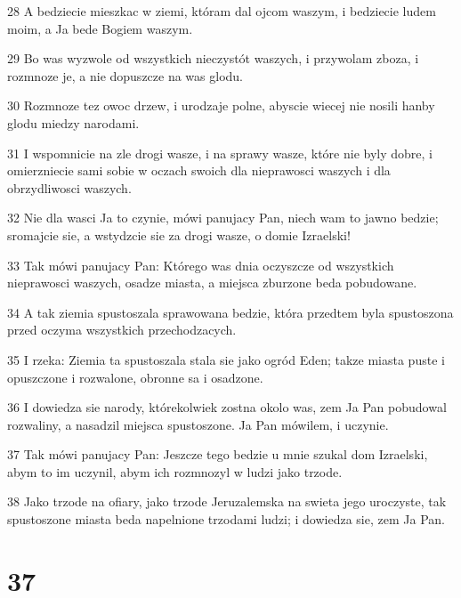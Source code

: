 \par 28 A bedziecie mieszkac w ziemi, któram dal ojcom waszym, i bedziecie ludem moim, a Ja bede Bogiem waszym.
\par 29 Bo was wyzwole od wszystkich nieczystót waszych, i przywolam zboza, i rozmnoze je, a nie dopuszcze na was glodu.
\par 30 Rozmnoze tez owoc drzew, i urodzaje polne, abyscie wiecej nie nosili hanby glodu miedzy narodami.
\par 31 I wspomnicie na zle drogi wasze, i na sprawy wasze, które nie byly dobre, i omierzniecie sami sobie w oczach swoich dla nieprawosci waszych i dla obrzydliwosci waszych.
\par 32 Nie dla wasci Ja to czynie, mówi panujacy Pan, niech wam to jawno bedzie; sromajcie sie, a wstydzcie sie za drogi wasze, o domie Izraelski!
\par 33 Tak mówi panujacy Pan: Którego was dnia oczyszcze od wszystkich nieprawosci waszych, osadze miasta, a miejsca zburzone beda pobudowane.
\par 34 A tak ziemia spustoszala sprawowana bedzie, która przedtem byla spustoszona przed oczyma wszystkich przechodzacych.
\par 35 I rzeka: Ziemia ta spustoszala stala sie jako ogród Eden; takze miasta puste i opuszczone i rozwalone, obronne sa i osadzone.
\par 36 I dowiedza sie narody, którekolwiek zostna okolo was, zem Ja Pan pobudowal rozwaliny, a nasadzil miejsca spustoszone. Ja Pan mówilem, i uczynie.
\par 37 Tak mówi panujacy Pan: Jeszcze tego bedzie u mnie szukal dom Izraelski, abym to im uczynil, abym ich rozmnozyl w ludzi jako trzode.
\par 38 Jako trzode na ofiary, jako trzode Jeruzalemska na swieta jego uroczyste, tak spustoszone miasta beda napelnione trzodami ludzi; i dowiedza sie, zem Ja Pan.

\chapter{37}


